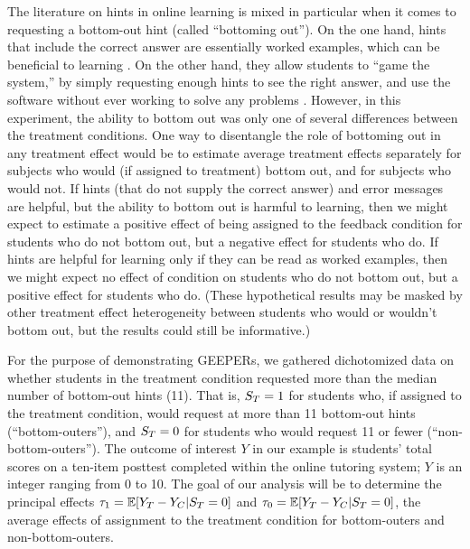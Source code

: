 \documentclass{statsoc} %
\begin{document}
The literature on hints in online learning is mixed \citep[see, e.g.,][]{aleven2016help,goldin2012learner,sales2021student} in particular when it comes to requesting a bottom-out hint (called ``bottoming out''). On the one hand, hints that include the correct answer are essentially worked examples, which can be beneficial to learning \citep[e.g.]{sweller1985use}. On the other hand, they allow students to ``game the system,'' by simply requesting enough hints to see the right answer, and use the software without ever working to solve any problems \citep[e.g.][]{guo2008trying}. However, in this experiment, the ability to bottom out was only one of several differences between the treatment conditions. One way to disentangle the role of bottoming out in any treatment effect would be to estimate average treatment effects separately for subjects who would (if assigned to treatment) bottom out, and for subjects who would not. If hints (that do not supply the correct answer) and error messages are helpful, but the ability to bottom out is harmful to learning, then we might expect to estimate a positive effect of being assigned to the feedback condition for students who do not bottom out, but a negative effect for students who do. If hints are helpful for learning only if they can be read as worked examples, then we might expect no effect of condition on students who do not bottom out, but a positive effect for students who do. (These hypothetical results may be masked by other treatment effect heterogeneity between students who would or wouldn't bottom out, but the results could still be informative.)

For the purpose of demonstrating GEEPERs, we gathered dichotomized data on %
whether students in the treatment condition requested more than the median number of bottom-out hints (11).
That is, $S_T=1$ for students who, if assigned to the treatment condition, would request at more than 11 bottom-out hints (``bottom-outers''), and $S_T=0$ for students who would request 11 or fewer (``non-bottom-outers''). %
The outcome of interest $Y$ in our example is students' total scores on a ten-item posttest completed within the online tutoring system; $Y$ is an integer ranging from 0 to 10.
The goal of our analysis will be to determine the principal effects $\tau_1=\mathbb{E}[Y_T-Y_C|S_T=0]$ and $\tau_0=\mathbb{E}[Y_T-Y_C|S_T=0]$, the average effects of assignment to the treatment condition for bottom-outers and non-bottom-outers.
\end{document}
